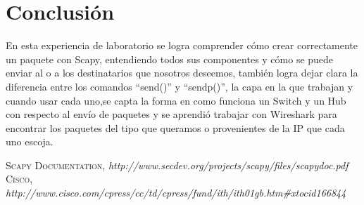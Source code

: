 \documentclass{udpreport}
\begin{document}
\chapter{Conclusión}
  	      En esta experiencia de laboratorio se logra comprender cómo crear correctamente un paquete con Scapy,
  	      entendiendo todos sus componentes y cómo se puede enviar al o a los destinatarios que nosotros deseemos, también
  	      logra dejar clara la diferencia entre los comandos “send()” y “sendp()”, la capa en la que trabajan y cuando usar cada
  	      uno,se capta la forma en como funciona un Switch y un Hub con respecto al envío de paquetes y se aprendió trabajar con
  	      Wireshark para encontrar los paquetes del tipo que queramos o provenientes de la IP que cada uno  escoja.
  	      
\begin{thebibliography}{x}
 \textsc{Scapy Documentation},
\textit{http://www.secdev.org/projects/scapy/files/scapydoc.pdf}
 \textsc{Cisco},
\textit{ http://www.cisco.com/cpress/cc/td/cpress/fund/ith/ith01gb.htm#xtocid166844}
\end{thebibliography}
\end{document}
